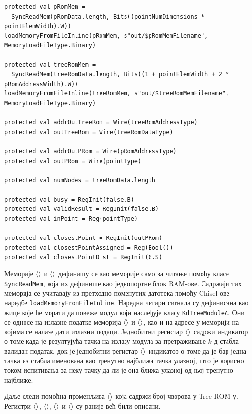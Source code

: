 \documentclass[master]{finthesis}
\newcommand*{\kd}{\texorpdfstring{$k$}{k}-д }
\newcommand*{\correctmath}[1]{%
    \ifcsname mathCorrectionFor#1\endcsname%
        \csname mathCorrectionFor#1\endcsname%
    \else%
        #1%
    \fi%
}
\newcommand*{\mfield}[1]{{\langle\correctmath{#1}\/\rangle}}
\newcommand*{\field}[1]{\texorpdfstring{$\mfield{#1}$}{⟨#1⟩}}
\newcommand*{\prog}[1]{\texttt{#1}}
\begin{document}
\begin{lstlisting}[style=Chisel, caption={Дефинисани сигнали и регистри у оквиру класе \prog{KdTreeModuleA}.}, label={lst:abstract-kd:sig}]
protected val pRomMem =
  SyncReadMem(pRomData.length, Bits((pointNumDimensions * pointElemWidth).W))
loadMemoryFromFileInline(pRomMem, s"out/$pRomMemFilename", MemoryLoadFileType.Binary)

protected val treeRomMem =
  SyncReadMem(treeRomData.length, Bits((1 + pointElemWidth + 2 * pRomAddressWidth).W))
loadMemoryFromFileInline(treeRomMem, s"out/$treeRomMemFilename", MemoryLoadFileType.Binary)

protected val addrOutTreeRom = Wire(treeRomAddressType)
protected val outTreeRom = Wire(treeRomDataType)

protected val addrOutPRom = Wire(pRomAddressType)
protected val outPRom = Wire(pointType)

protected val numNodes = treeRomData.length

protected val busy = RegInit(false.B)
protected val validResult = RegInit(false.B)
protected val inPoint = Reg(pointType)

protected val closestPoint = RegInit(outPRom)
protected val closestPointAssigned = Reg(Bool())
protected val closestPointDist = RegInit(0.S)
\end{lstlisting}

Меморије \field{pRomMem} и \field{treeRomMem} дефинишу се као меморије само за читање помоћу класе \prog{SyncReadMem}, која их дефинише као једнопортне блок RAM-ове. Садржаји тих меморија се учитавају из претходно поменутих датотека помоћу Chisel-ове наредбе \prog{loadMemoryFromFileInline}. Наредна четири сигнала су дефинисана као жице које ће морати да повеже модул који наслеђује класу \prog{KdTreeModuleA}. Они се односе на излазне податке меморија \field{pRomMem} и \field{treeRomMem}, као и на адресе у меморији на којима се налазе дати излазни подаци. Једнобитни регистар \field{validResult} садржи индикатор о томе када је резултујућа тачка на излазу модула за претраживање \kd стабла валидан податак, док је једнобитни регистар \field{closestPointAssigned} индикатор о томе да је бар једна тачка из стабла именована као тренутно најближа тачка улазној, што је корисно током испитивања за неку тачку да ли је она ближа улазној од њој тренутно најближе.

Даље следи помоћна променљива \field{numNodes} која садржи број чворова у Tree ROM-у. Регистри \field{busy}, \field{inPoint}, \field{closestPoint} и \field{closestPointDist} су раније већ били описани.
\end{document}
